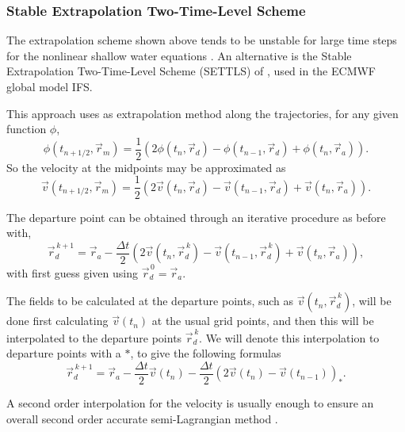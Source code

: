 \documentclass[10pt,a4paper]{article}
\begin{document}
\subsubsection*{Stable Extrapolation Two-Time-Level Scheme}
\label{sec:stable}
The extrapolation scheme shown above tends to be unstable for large time steps for the nonlinear shallow water equations \cite{Durran2010}. An alternative is the Stable Extrapolation Two-Time-Level Scheme (SETTLS) of \cite{Hortal2002}, used in the ECMWF global model IFS.

This approach uses as extrapolation method along the trajectories, for any given function $\phi$,
\begin{equation}
\phi(t_{n+1/2}, \vec{r}_m)=\frac{1}{2}\left(2\phi(t_{n}, \vec{r}_d)-\phi(t_{n-1}, \vec{r}_d) + \phi(t_{n}, \vec{r}_a)\right).
\end{equation}
So the velocity at the midpoints may be approximated as
\begin{equation}
\vec{v}(t_{n+1/2}, \vec{r}^{}_m)=\frac{1}{2} \left(2\vec{v}(t_{n}, \vec{r}_d)-\vec{v}(t_{n-1}, \vec{r}_d) + \vec{v}(t_{n}, \vec{r}_a) \right).
\end{equation}

The departure point can be obtained through an iterative procedure as before with, 
\begin{equation}
\vec{r}^{\,k+1}_d = \vec{r}_a- \frac{\Delta t}{2} \left(2\vec{v}(t_{n}, \vec{r}_d^{\,k})-\vec{v}(t_{n-1}, \vec{r}_d^{\,k}) + \vec{v}(t_{n}, \vec{r}_a) \right),
\end{equation}
with first guess given using $\vec{r}^{\,0}_d=\vec{r}_a$.

The fields to be calculated at the departure points, such as $\vec{v}(t_{n}, \vec{r}_d^{\,k})$, will be done first calculating $\vec{v}(t_{n})$ at the usual grid points, and then this will be interpolated to the departure points $\vec{r}_d^{\,k}$. We will denote this interpolation to departure points with a $*$, to give the following formulas
\begin{equation}
\vec{r}^{\,k+1}_d = \vec{r}_a- \frac{\Delta t}{2} \vec{v}(t_{n} ) - \frac{\Delta t}{2} \left(2\vec{v}(t_{n})-\vec{v}(t_{n-1})\right)_*  .
\end{equation}

A second order interpolation for the velocity is usually enough to ensure an overall second order accurate semi-Lagrangian method \cite{Peixoto2014}.
\end{document}
